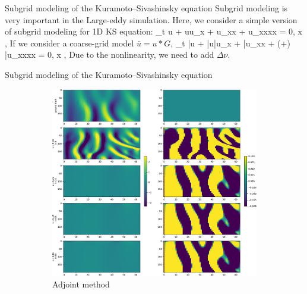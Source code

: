 \documentclass{beamer}
\begin{document}
\begin{frame}{Subgrid modeling of the Kuramoto–Sivashinsky equation}
	Subgrid modeling is very important in the Large-eddy simulation. Here, we consider a simple 
	version of subgrid modeling for 1D KS equation:
	\bequ\label{KS}
	\p_t u + uu_x + u_{xx} + \nu u_{xxxx} = 0, \quad x \in [0, L],
	\eequ
	If we consider a coarse-grid model $\bar{u} = u * G$,
	\bequ
	\p_t \bar{u} +  \bar{u}\bar{u}_x +  \bar{u}_{xx} + (\nu+\Delta\nu)  \bar{u}_{xxxx} = 0, \quad x \in [0, L],
	\eequ
	Due to the nonlinearity, we need to add $\Delta \nu$. 
\end{frame}

\begin{frame}{Subgrid modeling of the Kuramoto–Sivashinsky equation}
	\begin{figure}[ht]
		\centering
		\begin{subfigure}{0.5\linewidth} %
			\centering
			\includegraphics[width=\linewidth]{fig/ks-adjoint-cloudmap2.pdf}
			\caption{Adjoint method}
		  \end{subfigure}%
		  \begin{subfigure}{0.5\linewidth} %
			\centering

\end{subfigure}
\end{figure}
\end{frame}
\end{document}
